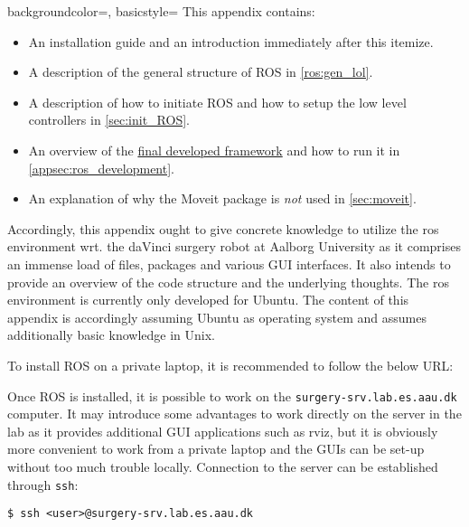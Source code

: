 {
    backgroundcolor=\color{black},
    basicstyle=\scriptsize\color{green}%
}
\vspace{-0.1cm}
This appendix contains:
\begin{itemize}
\item An installation guide and an introduction immediately after this itemize.
\item A description of the general structure of ROS in \autoref{ros:gen_lol}.
\item A description of how to initiate ROS and how to setup the low level controllers in \autoref{sec:init_ROS}.
\item An overview of the \underline{final developed framework} and how to run it in \autoref{appsec:ros_development}.
\item An explanation of why the Moveit package is \textit{not} used in \autoref{sec:moveit}.
\end{itemize}
\vspace{-0.1cm}
Accordingly, this appendix ought to give concrete knowledge to utilize the \gls{ros} environment wrt. the \gls{daVinci} surgery robot at Aalborg University as it comprises an immense load of files, packages and various GUI interfaces. It also intends to provide an overview of the code structure and the underlying thoughts. The \gls{ros} environment is currently only developed for Ubuntu. The content of this appendix is accordingly assuming Ubuntu as operating system and assumes additionally basic knowledge in Unix. 

To install ROS on a private laptop, it is recommended to follow the below URL:

\hspace{1cm} {}

Once ROS is installed, it is possible to work on the \texttt{surgery-srv.lab.es.aau.dk} computer. It may introduce some advantages to work directly on the server in the lab as it provides additional GUI applications such as rviz, but it is obviously more convenient to work from a private laptop and the GUIs can be set-up without too much trouble locally. Connection to the server can be established through \texttt{ssh}:

\hspace{1cm} \texttt{\$ ssh <user>@surgery-srv.lab.es.aau.dk}

